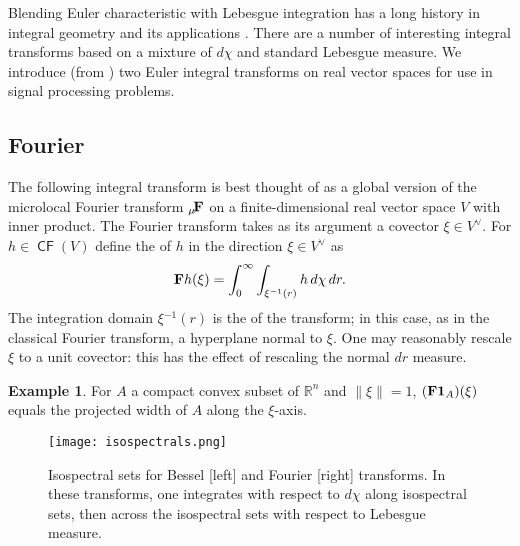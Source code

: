 \documentclass{psapm-l}
\theoremstyle{definition}
\newtheorem{example}[theorem]{Example}
\theoremstyle{remark}
\numberwithin{equation}{section}
\begin{document}
Blending Euler characteristic with Lebesgue integration has a long history in integral geometry and its applications \cite{Adler,Dohmen,GS,Wors1}. There are a number of interesting integral transforms based on a mixture of $d\chi$ and standard Lebesgue measure. We introduce (from \cite{GR}) two Euler integral transforms on real vector spaces for use in signal processing problems.

\subsection{Fourier}
\label{sec:fourier}

The following integral transform is best thought of as a global version of the microlocal Fourier transform ${{\bf _\mu\! F}}$ on a finite-dimensional real vector space $V$ with inner product. The Fourier transform takes as its argument a covector $\xi\in V^\vee$. For $h\in{{{\operatorname{\mathsf{{CF}}}}}}(V)$ define the {{}} of $h$ in the direction $\xi\in V^\vee$ as
\begin{equation}
    {{\bf F}} h(\xi) = \int_0^\infty\int_{\xi{^{-1}}(r)}h\,d\chi\,dr .
\end{equation}
The integration domain $\xi{^{-1}}(r)$ is the {{}} of the transform; in this case, as in the classical Fourier transform, a hyperplane normal to $\xi$. One may reasonably rescale $\xi$ to a unit covector: this has the effect of rescaling the normal $dr$ measure.

\begin{example}
\label{ex:fourierwidth}
For $A$ a compact convex subset of ${{\mathbb R}}^n$ and ${\left\|{{\xi}}\right\|}=1$, $({{\bf F}}{{\mathbf{1}}}_A)(\xi)$ equals the projected width of $A$ along the $\xi$-axis.
\end{example}

\begin{figure}[hbt]
\begin{center}
\texttt{[image: isospectrals.png]}
\caption{Isospectral sets for Bessel [left] and Fourier [right] transforms. In these transforms, one integrates with respect to $d\chi$ along isospectral sets, then across the isospectral sets with respect to Lebesgue measure.}
\label{fig:isospectrals}
\end{center}
\end{figure}
\end{document}
